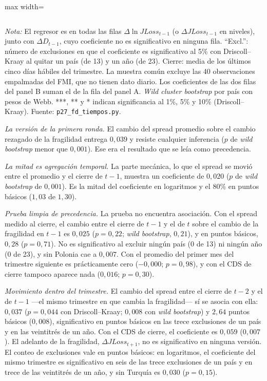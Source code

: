 \begin{table}[htbp]
\begin{adjustbox}{max width=\linewidth}
\begin{tabular}{l cccc cccc}
\bottomrule
\end{tabular}
\end{adjustbox}
\par\smallskip\parbox{0.95\linewidth}{\footnotesize \textit{Nota:} El regresor es en todas las filas $\Delta\ln JLoss_{t-1}$ (o $\Delta JLoss_{t-1}$ en niveles), junto con $\Delta D_{t-1}$, cuyo coeficiente no es significativo en ninguna fila. ``Excl.'': número de exclusiones en que el coeficiente es significativo al 5\% con Driscoll--Kraay al quitar un país (de 13) y un año (de 23). Cierre: media de los últimos cinco días hábiles del trimestre. La muestra común excluye las 40 observaciones empalmadas del FMI, que no tienen dato diario. Los coeficientes de las dos filas del panel B suman el de la fila del panel A. \textit{Wild cluster bootstrap} por país con pesos de Webb. ***, ** y * indican significancia al 1\%, 5\% y 10\% (Driscoll--Kraay). Fuente: \texttt{p27\_fd\_tiempos.py}.}
\end{table}

\emph{La versión de la primera ronda.} El cambio del spread promedio sobre el cambio rezagado de la fragilidad entrega $0{,}039$ y resiste cualquier inferencia ($p$ de \textit{wild bootstrap} menor que $0{,}001$). Ese era el resultado que se leía como precedencia.

\emph{La mitad es agregación temporal.} La parte mecánica, lo que el spread se movió entre el promedio y el cierre de $t-1$, muestra un coeficiente de $0{,}020$ ($p$ de \textit{wild bootstrap} de $0{,}001$). Es la mitad del coeficiente en logaritmos y el 80\% en puntos básicos ($1{,}03$ de $1{,}30$).

\emph{Prueba limpia de precedencia.} La prueba no encuentra asociación. Con el spread medido al cierre, el cambio entre el cierre de $t-1$ y el de $t$ sobre el cambio de la fragilidad en $t-1$ es $0{,}025$ ($p=0{,}22$; \textit{wild bootstrap}, $0{,}21$), y en puntos básicos, $0{,}28$ ($p=0{,}71$). No es significativo al excluir ningún país (0 de 13) ni ningún año (0 de 23), y sin Polonia cae a $0{,}007$. Con el promedio del primer mes del trimestre siguiente es prácticamente cero ($-0{,}000$; $p=0{,}98$), y con el CDS de cierre tampoco aparece nada ($0{,}016$; $p=0{,}30$).

\emph{Movimiento dentro del trimestre.} El cambio del spread entre el cierre de $t-2$ y el de $t-1$ ---el mismo trimestre en que cambia la fragilidad--- sí se asocia con ella: $0{,}037$ ($p=0{,}044$ con Driscoll--Kraay; $0{,}008$ con \textit{wild bootstrap}) y $2{,}64$ puntos básicos ($0{,}008$), significativo en puntos básicos en las trece exclusiones de un país y en las veintitrés de un año. Con el CDS de cierre, el coeficiente es $0{,}059$ ($0{,}007$). El adelanto de la fragilidad, $\Delta JLoss_{t+1}$, no es significativo en ninguna versión. El conteo de exclusiones vale en puntos básicos: en logaritmos, el coeficiente del mismo trimestre es significativo en seis de las trece exclusiones de un país y en trece de las veintitrés de un año, y sin Turquía es $0{,}030$ ($p=0{,}15$).

